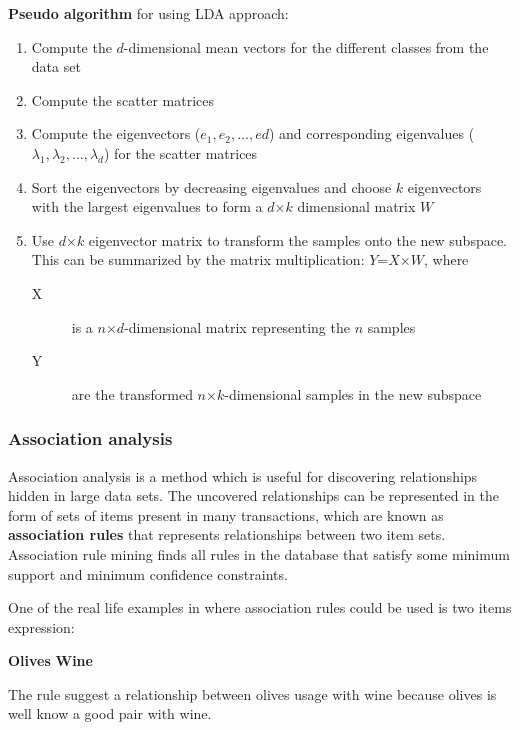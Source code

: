 \begin{enumerate}
    
    \textbf{Pseudo algorithm} for using LDA approach:
    \begin{enumerate}
        \item Compute the $d$-dimensional mean vectors for the different classes from the data set
        \item Compute the scatter matrices
        \item Compute the eigenvectors ($e_{1},e_{2},...,e{d}$) and corresponding eigenvalues ($\lambda_{1},\lambda_{2},...,\lambda_{d}$) for the scatter matrices
        \item Sort the eigenvectors by decreasing eigenvalues and choose $k$ eigenvectors with the largest eigenvalues to form a $d$×$k$ dimensional matrix $W$
        \item Use $d$×$k$ eigenvector matrix to transform the samples onto the new subspace. This can be summarized by the matrix multiplication: $Y$=$X$×$W$, where 
        \begin{description}
            \item [X] is a $n$×$d$-dimensional matrix representing the $n$ samples
            \item [Y] are the transformed $n$×$k$-dimensional samples in the new subspace
        \end{description}
    \end{enumerate}
    
\end{enumerate}


\subsubsection{Association analysis}

Association analysis is a method which is useful for discovering relationships hidden in large data sets. The uncovered relationships can be represented in the form of sets of items present in many transactions, which are known as \textbf{association rules} that represents relationships between two item sets. Association rule mining finds all rules in the database that satisfy some minimum support and minimum confidence constraints.

One of the real life examples in where association rules could be used is two items expression:

\textbf{Olives} \rightarrow \textbf{Wine}

The rule suggest a relationship between olives usage with wine because olives is well know a good pair with wine. 


